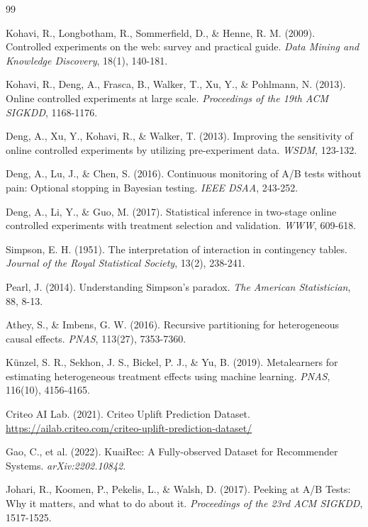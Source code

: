 \documentclass[11pt,twocolumn]{article}
\begin{document}
\begin{thebibliography}{99}

Kohavi, R., Longbotham, R., Sommerfield, D., \& Henne, R. M. (2009).
Controlled experiments on the web: survey and practical guide.
\textit{Data Mining and Knowledge Discovery}, 18(1), 140-181.

Kohavi, R., Deng, A., Frasca, B., Walker, T., Xu, Y., \& Pohlmann, N. (2013).
Online controlled experiments at large scale.
\textit{Proceedings of the 19th ACM SIGKDD}, 1168-1176.

Deng, A., Xu, Y., Kohavi, R., \& Walker, T. (2013).
Improving the sensitivity of online controlled experiments by utilizing pre-experiment data.
\textit{WSDM}, 123-132.

Deng, A., Lu, J., \& Chen, S. (2016).
Continuous monitoring of A/B tests without pain: Optional stopping in Bayesian testing.
\textit{IEEE DSAA}, 243-252.

Deng, A., Li, Y., \& Guo, M. (2017).
Statistical inference in two-stage online controlled experiments with treatment selection and validation.
\textit{WWW}, 609-618.

Simpson, E. H. (1951).
The interpretation of interaction in contingency tables.
\textit{Journal of the Royal Statistical Society}, 13(2), 238-241.

Pearl, J. (2014).
Understanding Simpson's paradox.
\textit{The American Statistician}, 88, 8-13.

Athey, S., \& Imbens, G. W. (2016).
Recursive partitioning for heterogeneous causal effects.
\textit{PNAS}, 113(27), 7353-7360.

Künzel, S. R., Sekhon, J. S., Bickel, P. J., \& Yu, B. (2019).
Metalearners for estimating heterogeneous treatment effects using machine learning.
\textit{PNAS}, 116(10), 4156-4165.

Criteo AI Lab. (2021).
Criteo Uplift Prediction Dataset.
\url{https://ailab.criteo.com/criteo-uplift-prediction-dataset/}

Gao, C., et al. (2022).
KuaiRec: A Fully-observed Dataset for Recommender Systems.
\textit{arXiv:2202.10842}.

Johari, R., Koomen, P., Pekelis, L., \& Walsh, D. (2017).
Peeking at A/B Tests: Why it matters, and what to do about it.
\textit{Proceedings of the 23rd ACM SIGKDD}, 1517-1525.


\end{thebibliography}
\end{document}
